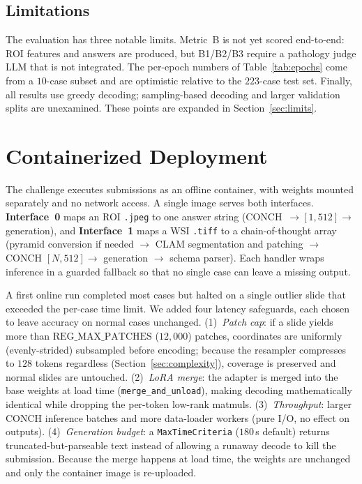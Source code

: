 \documentclass[11pt]{article}
\newcommand{\code}[1]{\texttt{\small #1}}
\begin{document}
\subsection{Limitations}
The evaluation has three notable limits. Metric~B is not yet scored end-to-end:
ROI features and answers are produced, but B1/B2/B3 require a pathology judge LLM
that is not integrated. The per-epoch numbers of Table~\ref{tab:epochs} come from
a $10$-case subset and are optimistic relative to the $223$-case test set.
Finally, all results use greedy decoding; sampling-based decoding and larger
validation splits are unexamined. These points are expanded in
Section~\ref{sec:limits}.

\section{Containerized Deployment}
\label{sec:deploy}
The challenge executes submissions as an offline container, with weights mounted
separately and no network access. A single image serves both interfaces.
\textbf{Interface~0} maps an ROI \code{.jpeg} to one answer string
(CONCH~$\to[1,512]\to$ generation), and \textbf{Interface~1} maps a WSI
\code{.tiff} to a chain-of-thought array (pyramid conversion if needed $\to$ CLAM
segmentation and patching $\to$ CONCH $[N,512]\to$ generation $\to$ schema
parser). Each handler wraps inference in a guarded fallback so that no single case
can leave a missing output.

A first online run completed most cases but halted on a single outlier slide that
exceeded the per-case time limit. We added four latency safeguards, each chosen to
leave accuracy on normal cases unchanged. (1)~\emph{Patch cap}: if a slide yields
more than $\mathrm{REG\_MAX\_PATCHES}$ ($12{,}000$) patches, coordinates are
uniformly (evenly-strided) subsampled before encoding; because the resampler
compresses to $128$ tokens regardless (Section~\ref{sec:complexity}), coverage is
preserved and normal slides are untouched. (2)~\emph{LoRA merge}: the adapter is
merged into the base weights at load time (\code{merge\_and\_unload}), making
decoding mathematically identical while dropping the per-token low-rank matmuls.
(3)~\emph{Throughput}: larger CONCH inference batches and more data-loader workers
(pure I/O, no effect on outputs). (4)~\emph{Generation budget}: a
\code{MaxTimeCriteria} ($180$\,s default) returns truncated-but-parseable text
instead of allowing a runaway decode to kill the submission. Because the merge
happens at load time, the weights are unchanged and only the container image is
re-uploaded.
\end{document}
